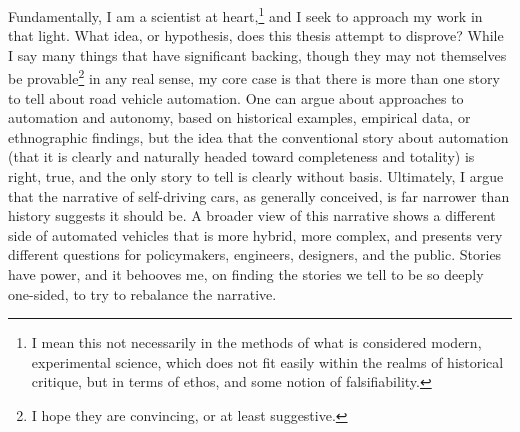Fundamentally, I am a scientist at heart,\footnote{I mean this not necessarily in
  the methods of what is considered modern, experimental science,
  which does not fit easily within the realms of historical critique,
  but in terms of ethos, and some notion of falsifiability.} and I
seek to approach my 
work in that light. What idea, or hypothesis, does this thesis attempt
to disprove? While I say many things that have significant backing,
though they may not themselves be provable\footnote{I hope they are
  convincing, or at least suggestive.} in any real sense, my core case
is that there is more than one story to tell about road vehicle
automation. One can argue about approaches to automation and autonomy,
based on historical examples, empirical data, or ethnographic
findings, but the idea that the conventional story about automation
(that it is clearly and naturally headed toward completeness and
totality) is right, true, and the only story to tell is clearly
without basis. Ultimately, I argue that the narrative of self-driving cars, as
generally conceived, is far narrower than history suggests it should
be. A broader view of this narrative shows a different side of
automated vehicles that is more hybrid, more complex, and presents
very different questions for policymakers, engineers, designers, and
the public. Stories have power, and it
behooves me, on finding the stories we tell to be so deeply one-sided,
to try to rebalance the narrative.



